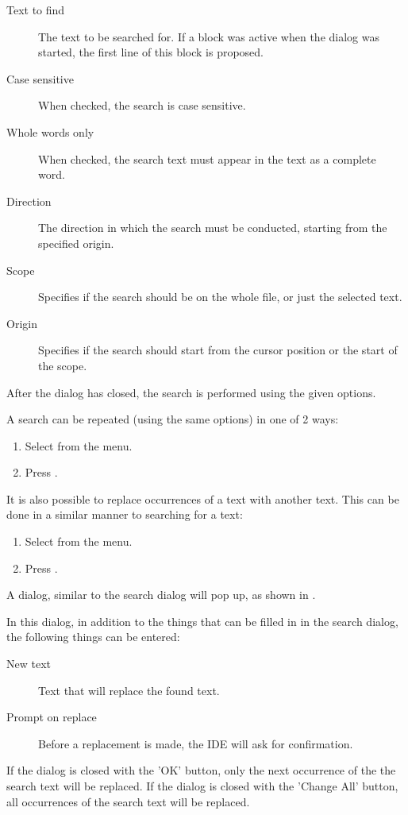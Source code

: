 
\begin{description}
\item[Text to find] The text to be searched for. If a block was active when
the dialog was started, the first line of this block is proposed.
\item[Case sensitive] When checked, the search is case sensitive.
\item[Whole words only] When checked, the search text must appear in the
text as a complete word.
\item[Direction] The direction in which the search must be conducted,
starting from the specified origin.
\item[Scope] Specifies if the search should be on the whole file, or just the selected
text.
\item[Origin] Specifies if the search should start from the cursor position or the start
of the scope.
\end{description}
After the dialog has closed, the search is performed using the given options.

A search can be repeated (using the same options) in one of 2 ways:
\begin{enumerate}
\item Select  from the menu.
\item Press .
\end{enumerate}

It is also possible to replace occurrences of a text with another text.
This can be done in a similar manner to searching for a text:
\begin{enumerate}
\item Select  from the menu.
\item Press .
\end{enumerate}
A dialog, similar to the search dialog will pop up, as shown in .


In this dialog, in addition to the things that can be filled in in the
search dialog, the following things can be entered:
\begin{description}
\item [New text] Text that will replace the found text.
\item [Prompt on replace] Before a replacement is made, the IDE will ask for
confirmation.
\end{description}
If the dialog is closed with the 'OK' button, only the next occurrence of
the the search text will be replaced.
If the dialog is closed with the 'Change All' button, all occurrences of
the search text will be replaced.

